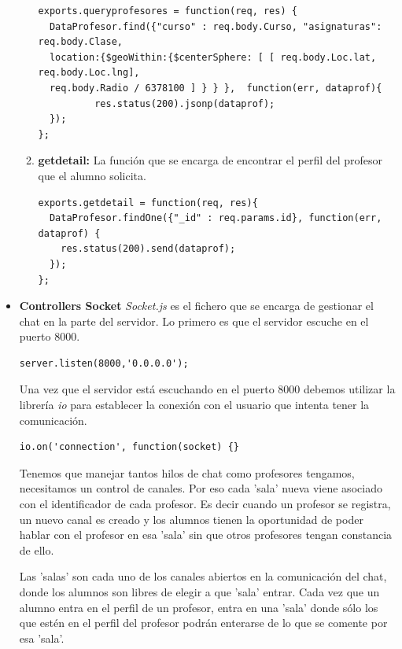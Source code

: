 \begin{itemize}
\begin{enumerate}
\begin{lstlisting}
exports.queryprofesores = function(req, res) {
  DataProfesor.find({"curso" : req.body.Curso, "asignaturas": req.body.Clase,
  location:{$geoWithin:{$centerSphere: [ [ req.body.Loc.lat, req.body.Loc.lng],
  req.body.Radio / 6378100 ] } } },  function(err, dataprof){
	      res.status(200).jsonp(dataprof);
  });
};
\end{lstlisting}

    \item \textbf {getdetail: } La función que se encarga de encontrar el perfil del profesor que el alumno solicita.

\begin{lstlisting}
exports.getdetail = function(req, res){
  DataProfesor.findOne({"_id" : req.params.id}, function(err, dataprof) {
    res.status(200).send(dataprof);
  });
};

\end{lstlisting}


\end{enumerate}
\item \textbf{Controllers Socket} \textit{Socket.js} es el fichero que se encarga de gestionar el chat en la parte del servidor. Lo primero es que el servidor escuche en el puerto 8000.
\begin{lstlisting}
server.listen(8000,'0.0.0.0');
\end{lstlisting}

Una vez que el servidor está escuchando en el puerto 8000 debemos utilizar la librería \textit{io} para establecer la conexión con el usuario que intenta tener la comunicación.

\begin{lstlisting}
io.on('connection', function(socket) {}
\end{lstlisting}

Tenemos que manejar tantos hilos de chat como profesores tengamos, necesitamos un control de canales. Por eso cada 'sala' nueva viene asociado con el identificador de cada profesor. Es decir cuando un profesor se registra, un nuevo canal es creado y los alumnos tienen la oportunidad de poder hablar con el profesor en esa 'sala' sin que otros profesores tengan constancia de ello.

Las 'salas' son cada uno de los canales abiertos en la comunicación del chat, donde los alumnos son libres de elegir a que 'sala' entrar. Cada vez que un alumno entra en el perfil de un profesor, entra en una 'sala' donde sólo los que estén en el perfil del profesor podrán enterarse de lo que se comente por esa 'sala'.


\end{itemize}

